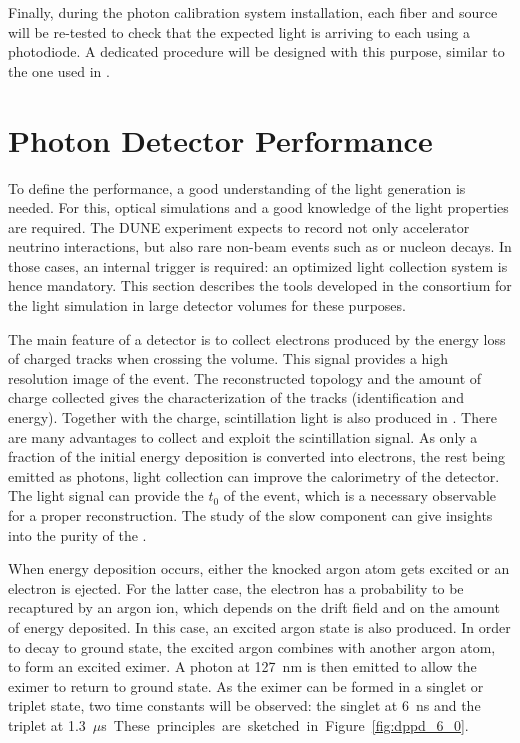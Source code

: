 Finally, during the photon calibration system installation, each fiber and source will be re-tested to check that the expected light is arriving to each  using a photodiode. A dedicated procedure will be designed with this purpose, similar to the one used in .

\section{Photon Detector Performance}
\label{sec:fddp-pd-6}

To define the  performance, a good understanding of the light generation is needed. For this, optical simulations and a good knowledge of the light properties are required. The DUNE experiment expects to record not only accelerator neutrino interactions, but also rare non-beam events such as  or nucleon decays. In those cases, an internal trigger is required: an optimized light collection system is hence mandatory. This section describes the tools developed in the consortium for the light simulation in large detector volumes for these purposes.

The main feature of a \lartpc detector is to collect electrons produced by the energy loss of charged tracks when crossing the volume. This signal provides a high resolution \threed image of the event. The reconstructed topology and the amount of charge collected gives the characterization of the tracks (identification and energy). Together with the charge, scintillation light is also produced in \lar. There are many advantages to collect and exploit the scintillation signal. As only a fraction of the initial energy deposition is converted into electrons, the rest being emitted as photons, light collection can improve the calorimetry of the detector. The light signal can provide the $t_0$ of the event, which is a necessary observable for a proper reconstruction. The study of the slow component can give insights into the purity of the \lar. 

When energy deposition occurs, either the knocked argon atom gets excited or an electron is ejected. For the latter case, the electron has a probability to be recaptured by an argon ion, which depends on the drift field and on the amount of energy deposited. In this case, an excited argon state is also produced. In order to decay to ground state, the excited argon combines with another argon atom, to form an excited eximer. A photon at \SI{127}{nm} is then emitted to allow the eximer to return to ground state. As the eximer can be formed in a singlet or triplet state, two time constants will be observed: the singlet at \SI{6}{ns}
and the triplet at \SI{1.3}{$\mu$s}. These principles are sketched in Figure~\ref{fig:dppd_6_0}.

